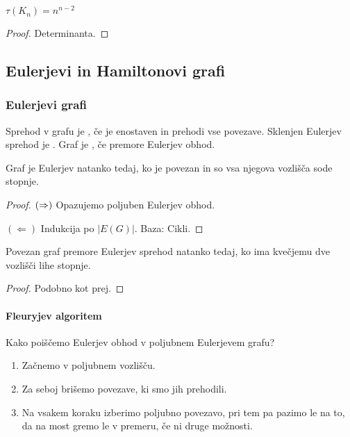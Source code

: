 \begin{izrek}[Cayley]
    $\tau(K_n) = n^{n-2}$
\end{izrek}

\begin{proof}
    Determinanta.
\end{proof}

\newpage
\subsection{Eulerjevi in Hamiltonovi grafi}
\subsubsection{Eulerjevi grafi}
\begin{definicija}
    Sprehod v grafu je , če je enostaven in prehodi vse povezave. Sklenjen Eulerjev sprehod je . Graf je , če premore Eulerjev obhod.
\end{definicija}

\begin{izrek}
    Graf je Eulerjev natanko tedaj, ko je povezan in so vsa njegova vozlišča sode stopnje.
\end{izrek}

\begin{proof}
    $(\Rightarrow)$ Opazujemo poljuben Eulerjev obhod.

    $(\Leftarrow)$ Indukcija po $|E(G)|$. Baza: Cikli.
\end{proof}

\begin{izrek}
    Povezan graf premore Eulerjev sprehod natanko tedaj, ko ima kvečjemu dve vozlišči lihe stopnje.
\end{izrek}

\begin{proof}
    Podobno kot prej.
\end{proof}

\paragraph{Fleuryjev algoritem} Kako poiščemo Eulerjev obhod v poljubnem Eulerjevem grafu?

\begin{enumerate}
    \item Začnemo v poljubnem vozlišču.
    \item Za seboj brišemo povezave, ki smo jih prehodili.
    \item Na vsakem koraku izberimo poljubno povezavo, pri tem pa pazimo le na to, da na most gremo le v premeru, če ni druge možnosti.
\end{enumerate}

